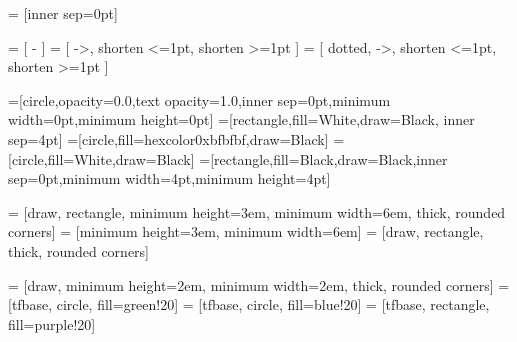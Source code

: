 \usepackage{tikz}
\usetikzlibrary{bayesnet}
\usetikzlibrary{shapes,arrows}



\tikzset{>=latex}
   = [inner sep=0pt]

  = [ - ]
  = [ ->, shorten <=1pt, shorten >=1pt ]
 = [ dotted, ->, shorten <=1pt, shorten >=1pt ]

=[circle,opacity=0.0,text opacity=1.0,inner sep=0pt,minimum
width=0pt,minimum height=0pt]
=[rectangle,fill=White,draw=Black, inner sep=4pt]
=[circle,fill=hexcolor0xbfbfbf,draw=Black]
=[circle,fill=White,draw=Black]
=[rectangle,fill=Black,draw=Black,inner sep=0pt,minimum width=4pt,minimum height=4pt]

 = [draw, rectangle,
  minimum height=3em, minimum width=6em, thick,
  rounded corners]
 = [minimum height=3em, minimum width=6em]
 = [draw, rectangle, thick, rounded corners]

 = [draw,
  minimum height=2em, minimum width=2em, thick,
  rounded corners]
 = [tfbase, circle, fill=green!20]
 = [tfbase, circle, fill=blue!20]
 = [tfbase, rectangle, fill=purple!20]
